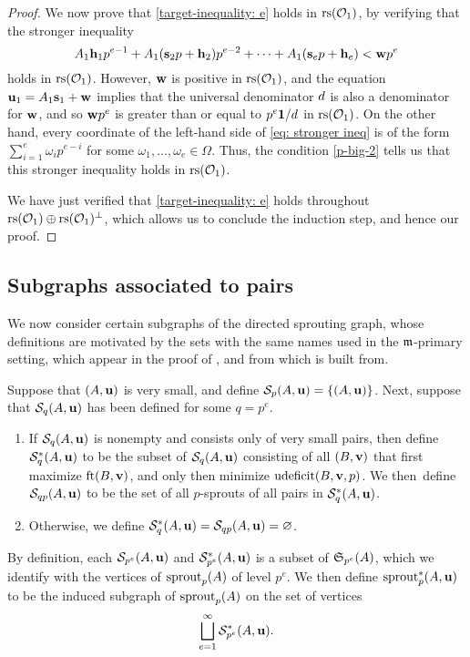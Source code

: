 \documentclass{amsart}
\begin{document}
\begin{proof}
    We now prove that \eqref{target-inequality: e} holds in $\operatorname{rs}(\mathcal{O}_1)$, by verifying that the stronger inequality
    \begin{equation}
       A_1 \mathbf{h}_1 p^{e-1} + A_1 (\mathbf{s}_2 p + \mathbf{h}_2)p^{e-2} + \cdots + A_1 (\mathbf{s}_e p + \mathbf{h}_e ) < \mathbf{w}p^e
       \label{eq: stronger ineq}
    \end{equation}
    holds in $\operatorname{rs}(\mathcal{O}_1)$.
    However, $\mathbf{w}$ is positive in $\operatorname{rs}(\mathcal{O}_1)$, and the equation $\mathbf{u}_1 = A_1 \mathbf{s}_1 + \mathbf{w}$ implies that the universal denominator $d$ is also a denominator for $\mathbf{w}$, and so $\mathbf{w} p^e$ is greater than or equal to $p^e \mathbf{1} / d$ in $\operatorname{rs}(\mathcal{O}_1)$.
    On the other hand, every coordinate of the left-hand side of \eqref{eq: stronger ineq} is of the form $\sum_{i=1}^{e} \omega_i  p^{e-i}$ for some $\omega_1, \ldots, \omega_e \in \Omega$.
    Thus, the condition \eqref{p-big-2} tells us that this stronger inequality holds in $\operatorname{rs}(\mathcal{O}_1)$.

    We have just verified that \eqref{target-inequality: e} holds throughout $\operatorname{rs}(\mathcal{O}_1) \oplus \operatorname{rs}(\mathcal{O}_1)^{\perp}$, which allows us to conclude the induction step, and hence our proof.
\end{proof}


\subsection{Subgraphs associated to pairs}

We now consider certain subgraphs of the directed sprouting graph, whose definitions are motivated by the sets with the same names used in the $\mathfrak{m}$-primary setting, which appear in the proof of , and from which  is built from.

\begin{definition}
   Suppose that $(A,\mathbf{u})$ is very small, and define $\mathcal{S}_p(A,\mathbf{u}) = \{ (A,\mathbf{u}) \}$.
   Next, suppose that $\mathcal{S}_q(A,\mathbf{u})$ has been defined for some $q=p^e$.
   \begin{enumerate}
      \item If $\mathcal{S}_q(A,\mathbf{u})$ is nonempty and consists only of very small pairs, then define $\mathcal{S}^{\ast}_q(A,\mathbf{u})$ to be the subset of $\mathcal{S}_q(A,\mathbf{u})$ consisting of all $(B,\mathbf{v})$ that first maximize $\operatorname{ft}(B, \mathbf{v})$, and only then minimize $\operatorname{udeficit}(B,\mathbf{v},p)$.  We then~define~$\mathcal{S}_{qp}(A,\mathbf{u})$ to be the set of all $p$-sprouts of all pairs in $\mathcal{S}^{\ast}_q(A,\mathbf{u})$.
      \item Otherwise, we define $\mathcal{S}_q^{\ast}(A,\mathbf{u})=\mathcal{S}_{qp}(A,\mathbf{u}) = \varnothing$.
   \end{enumerate}
   By definition, each $\mathcal{S}_{p^e}(A,\mathbf{u})$ and $\mathcal{S}^{\ast}_{p^e}(A,\mathbf{u})$ is a subset of $\mathfrak{S}_{p^e}(A)$, which we identify with the vertices of $\operatorname{sprout}_p(A)$ of level $p^e$.
   We then define $\operatorname{sprout}_p^{\ast}(A,\mathbf{u})$ to be the induced subgraph of $\operatorname{sprout}_p(A)$ on the set of vertices
   \[ \bigsqcup_{e=1}^{\infty} \mathcal{S}^{\ast}_{p^e}(A,\mathbf{u}). \]
\end{definition}
\end{document}

